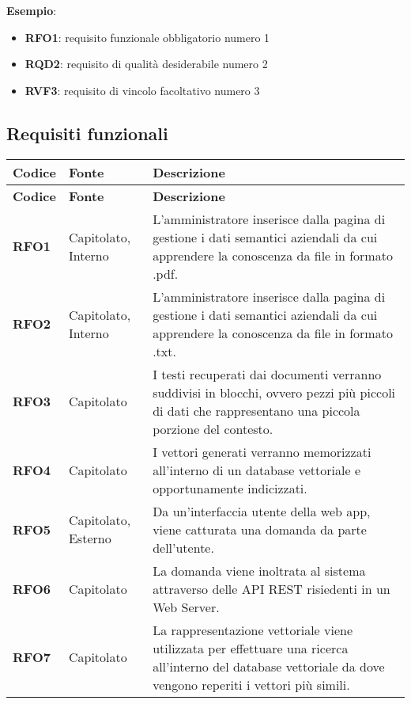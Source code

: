 \textbf{Esempio}:
\begin{itemize}
	\item \textbf{RFO1}: requisito funzionale obbligatorio numero 1
	\item \textbf{RQD2}: requisito di qualità desiderabile numero 2
	\item \textbf{RVF3}: requisito di vincolo facoltativo numero 3
\end{itemize}

\pagebreak
\subsection{Requisiti funzionali}
\begin{longtable}{|>{\centering\arraybackslash}m{}|>{\centering\arraybackslash}m{}|>{\arraybackslash}m{}|}
	\hline
	\textbf{Codice} & \textbf{Fonte} & \textbf{Descrizione}\\\hline
	\endfirsthead
	\hline
	\textbf{Codice} & \textbf{Fonte} & \textbf{Descrizione}\\\hline
	\endhead
	\hline
	\textbf{RFO1} & Capitolato, Interno & L'amministratore inserisce dalla pagina di gestione i dati semantici aziendali da cui apprendere la conoscenza da file in formato .pdf. \\
	\hline
	\textbf{RFO2} & Capitolato, Interno & L'amministratore inserisce dalla pagina di gestione i dati semantici aziendali da cui apprendere la conoscenza da file in formato .txt. \\
	\hline
	\textbf{RFO3} & Capitolato 			& I testi recuperati dai documenti verranno suddivisi in blocchi, ovvero pezzi più piccoli di dati che rappresentano una piccola porzione del contesto. \\
	\hline
	\textbf{RFO4} & Capitolato 			& I vettori generati verranno memorizzati all’interno di un database vettoriale e opportunamente indicizzati. \\
	\hline
	\textbf{RFO5} & Capitolato, Esterno & Da un’interfaccia utente della web app, viene catturata una domanda da parte dell’utente. \\
	\hline
	\textbf{RFO6} & Capitolato 			& La domanda viene inoltrata al sistema attraverso delle API REST risiedenti in un Web Server. \\
	\hline
	\textbf{RFO7} & Capitolato 			& La rappresentazione vettoriale viene utilizzata per effettuare una ricerca all’interno del database vettoriale da dove vengono reperiti i vettori più simili. \\

\end{longtable}
